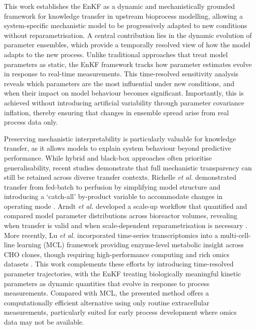 This work establishes the EnKF as a dynamic and mechanistically grounded framework for knowledge transfer in upstream bioprocess modelling, allowing a system-specific mechanistic model to be progressively adapted to new conditions without reparametrisation. A central contribution lies in the dynamic evolution of parameter ensembles, which provide a temporally resolved view of how the model adapts to the new process. Unlike traditional approaches that treat model parameters as static, the EnKF framework tracks how parameter estimates evolve in response to real-time measurements. This time-resolved sensitivity analysis reveals which parameters are the most influential under new conditions, and when their impact on model behaviour becomes significant. Importantly, this is achieved without introducing artificial variability through parameter covariance inflation, thereby ensuring that changes in ensemble spread arise from real process data only.

Preserving mechanistic interpretability is particularly valuable for knowledge transfer, as it allows models to explain system behaviour beyond predictive performance. While hybrid and black-box approaches often prioritise generalisability, recent studies demonstrate that full mechanistic transparency can still be retained across diverse transfer contexts. Richelle \textit{et al.} demonstrated transfer from fed-batch to perfusion by simplifying model structure and introducing a ‘catch-all’ by-product variable to accommodate changes in operating mode \cite{Richelle2022Model-basedPerfusion}. Arndt \textit{et al.}  developed a scale-up workflow that quantified and compared model parameter distributions across bioreactor volumes, revealing when transfer is valid and when scale-dependent reparametrisation is necessary \cite{Arndt2021Model-basedSystems}. More recently, Lu \textit{et al.} incorporated time-series transcriptomics into a multi-cell-line learning (MCL) framework providing enzyme-level metabolic insight across CHO clones, though requiring high-performance computing and rich omics datasets \cite{Lu2024Multi-cell-lineModels}. This work complements these efforts by introducing time-resolved parameter trajectories, with the EnKF treating biologically meaningful kinetic parameters as dynamic quantities that evolve in response to process measurements. Compared with MCL, the presented method offers a computationally efficient alternative using only routine extracellular measurements, particularly suited for early process development where omics data may not be available.

